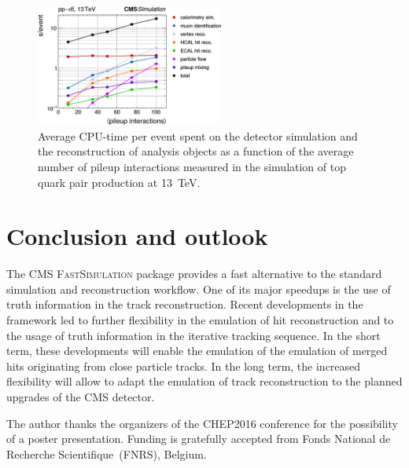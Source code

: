 \documentclass[a4paper]{jpconf}
\begin{document}
\begin{figure}[htbp]
\begin{center}
\includegraphics[width=0.55\textwidth]{figures/cpu_profile.pdf}
\caption{\label{fig:cpu}Average CPU-time per event spent on the detector simulation and the reconstruction of analysis objects as a function of the average number of pileup interactions measured in the simulation of top quark pair production at 13~TeV.}
\end{center}
\end{figure}

\section{Conclusion and outlook}

The CMS \textsc{FastSimulation} package provides a fast alternative to the standard simulation and reconstruction workflow. One of its major speedups is the use of truth information in the track reconstruction. Recent developments in the framework led to further flexibility in the emulation of hit reconstruction and to the usage of truth information in the iterative tracking sequence. In the short term, these developments will enable the emulation of the emulation of merged hits originating from close particle tracks. In the long term, the increased flexibility will allow to adapt the emulation of track reconstruction to the planned upgrades of the CMS detector.


\ack
The author thanks the organizers of the \textsc{CHEP2016} conference for the possibility of a poster presentation. Funding is gratefully accepted from Fonds National de Recherche Scientifique~(FNRS), Belgium.
\end{document}

